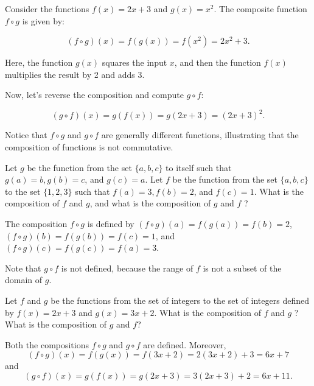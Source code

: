 \begin{example}
    

Consider the functions \( f(x) = 2x + 3 \) and \( g(x) = x^2 \). The composite function \( f \circ g \) is given by:

\[
(f \circ g)(x) = f(g(x)) = f(x^2) = 2x^2 + 3.
\]

Here, the function \( g(x) \) squares the input \( x \), and then the function \( f(x) \) multiplies the result by 2 and adds 3.
\end{example}

Now, let's reverse the composition and compute \( g \circ f \):

\[
(g \circ f)(x) = g(f(x)) = g(2x + 3) = (2x + 3)^2.
\]

Notice that \( f \circ g \) and \( g \circ f \) are generally different functions, illustrating that the composition of functions is not commutative.

\begin{example}
    Let $g$ be the function from the set $\{a, b, c\}$ to itself such that $g(a)=b, g(b)=c$, and $g(c)=a$. Let $f$ be the function from the set $\{a, b, c\}$ to the set $\{1,2,3\}$ such that $f(a)=3, f(b)=2$, and $f(c)=1$. What is the composition of $f$ and $g$, and what is the composition of $g$ and $f$ ?

    \begin{solution}
        The composition $f \circ g$ is defined by $(f \circ g)(a)=f(g(a))=f(b)=2$, $(f \circ g)(b)=f(g(b))=f(c)=1$, and $(f \circ g)(c)=f(g(c))=f(a)=3$.
        
        Note that $g \circ f$ is not defined, because the range of $f$ is not a subset of the domain of $g$.
    \end{solution}
\end{example}


\begin{example}
Let $f$ and $g$ be the functions from the set of integers to the set of integers defined by $f(x)=2 x+3$ and $g(x)=3 x+2$. What is the composition of $f$ and $g$ ? What is the composition of $g$ and $f$?

\begin{solution}
Both the compositions $f \circ g$ and $g \circ f$ are defined. Moreover,
\[
(f \circ g)(x)=f(g(x))=f(3 x+2)=2(3 x+2)+3=6 x+7
\]
and
\[
(g \circ f)(x)=g(f(x))=g(2 x+3)=3(2 x+3)+2=6 x+11 .
\]
\end{solution}
\end{example}

